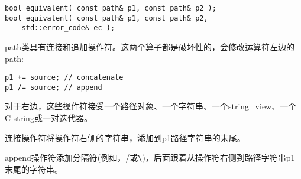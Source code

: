 \begin{lstlisting}[style=styleCXX]
bool equivalent( const path& p1, const path& p2 );
bool equivalent( const path& p1, const path& p2,
	std::error_code& ec );
\end{lstlisting}

path类具有连接和追加操作符。这两个算子都是破坏性的，会修改运算符左边的path:

\begin{lstlisting}[style=styleCXX]
p1 += source; // concatenate
p1 /= source; // append
\end{lstlisting}

对于右边，这些操作符接受一个路径对象、一个字符串、一个string\_view、一个C-string或一对迭代器。

连接操作符将操作符右侧的字符串，添加到p1路径字符串的末尾。

append操作符添加分隔符(例如，/或\verb|\|)，后面跟着从操作符右侧到路径字符串p1末尾的字符串。







